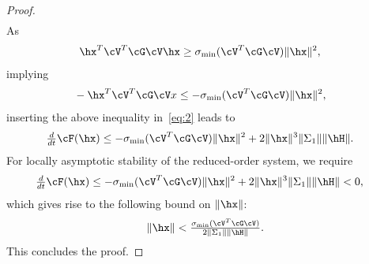 \begin{proof}
\begin{align}
 \end{align}
As
 \begin{align*}
  & \hx^T \cV^T\cG\cV \hx \geq  \sigma_{\text{min}}(\cV^T\cG\cV) \|\hx\|^2,
 \end{align*}
implying
  \begin{align*}
   &  -\hx^T\cV^T\cG\cV x \leq -\sigma_{\text{min}}(\cV^T\cG\cV) \|\hx\|^2,
  \end{align*}
 inserting the above inequality in~\eqref{eq:2} leads to
  \begin{align*}
   \tfrac{d}{dt}\cF(\hx) &\leq  -\sigma_{\text{min}}(\cV^T\cG\cV) \|\hx\|^2 +  2\|\hx\|^3 \|\Sigma_1\| \|\hH\|.
  \end{align*}
For locally asymptotic stability of the reduced-order system, we require
   \begin{align*}
   \tfrac{d}{dt}\cF(\hx) &\leq  -\sigma_{\text{min}}(\cV^T\cG\cV) \|\hx\|^2 +  2\|\hx\|^3 \|\Sigma_1\| \|\hH\| <0,
  \end{align*}
which gives rise to the following bound on $\|\hx\|$:
  $$\|\hx\| < \tfrac{\sigma_{\text{min}}(\cV^T\cG\cV)}{2 \|\Sigma_1\|  \|\hH\|}.$$
  This concludes the proof.
\end{proof}
%
%
